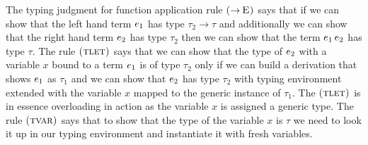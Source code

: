 \documentclass[format=acmsmall,manuscript,review,screen,nonacm,margin=1in,11pt]{acmart}
\begin{document}
The typing judgment for function application rule $\textsc{(\ensuremath{\mathord{\to}}\!~E)}$
says that if we can show that the left hand term $e_1$ has type $\tau_2 \to\tau$ and additionally we can
show that the right hand term $e_2$ has type $\tau_2$ then we can show
that the term $e_1\,e_2$ has type $\tau$. The rule $\textsc{(tlet)}$ says that we can show
that the type of $e_2$ with a variable $x$ bound to a term $e_1$ is of type $\tau_2$
only if we can build a derivation that shows $e_1$ as $\tau_1$ and we can show that
$e_2$ has type $\tau_2$ with typing environment extended with the variable $x$ mapped
to the generic instance of $\tau_1$. The $\textsc{(tlet)}$ is in essence overloading in action
as the variable $x$ is assigned a generic type. The rule $\textsc{(tvar)}$ says that to show
that the type of the variable $x$ is $\tau$ we need to look it up in our typing environment
and instantiate it with fresh variables. %
\end{document}
